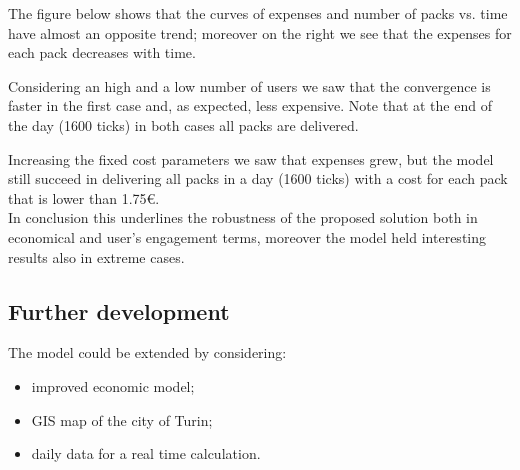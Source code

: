 \documentclass[11pt,a4paper]{article}
\begin{document}
The figure below shows that the curves of expenses and number of packs vs. time have almost an opposite trend; moreover on the right we see that the expenses for each pack decreases with time.

\newpage
Considering an high and a low number of users we saw that the convergence is faster in the first case and, as expected, less expensive. Note that at the end of the day (1600 ticks) in both cases all packs are delivered.


Increasing the fixed cost parameters we saw that expenses grew, but the model still succeed in delivering all packs in a day (1600 ticks) with a cost for each pack that is lower than 1.75\euro{}.
\\
In conclusion this underlines the robustness of the proposed solution both in economical and user's engagement terms, moreover the model held interesting results also in extreme cases. 

\subsection*{Further development}
The model could be extended by considering:
\begin{itemize}
\item improved economic model;
\item GIS map of the city of Turin;
\item daily data for a real time calculation.
\end{itemize}
\end{document}
